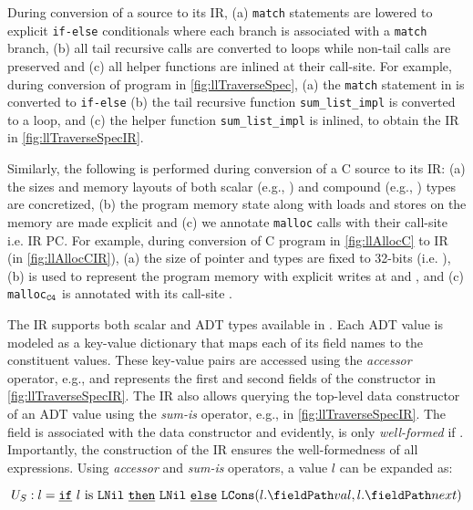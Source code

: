 During conversion of a \SpecL{} source to its IR,
(a) {\tt match} statements are lowered to explicit {\tt if-else} conditionals where each branch
is associated with a {\tt match} branch,
(b) all tail recursive calls are converted to loops while non-tail calls are preserved and
(c) all helper functions are inlined at their call-site.
For example, during conversion of \SpecL{} program in \cref{fig:llTraverseSpec},
(a) the {\tt match} statement in  is converted to {\tt if-else}
(b) the tail recursive function {\tt sum\_list\_impl} is converted to a loop,
and (c) the helper function {\tt sum\_list\_impl} is inlined,
to obtain the IR in \cref{fig:llTraverseSpecIR}.

Similarly, the following is performed during conversion of a C source to its IR:
(a) the sizes and memory layouts of both scalar (e.g., )
and compound (e.g., ) types are concretized,
(b) the program memory state along with loads and stores on the memory are made explicit and
(c) we annotate {\tt malloc} calls with their call-site i.e. IR PC.
For example, during conversion of C program in \cref{fig:llAllocC} to IR (in \cref{fig:llAllocCIR}),
(a) the size of pointer and  types are fixed to 32-bits (i.e. ),
(b) \mem{} is used to represent the program memory with explicit writes at  and ,
and (c) {\tt malloc$_{{\tt C4}}$} is annotated with its call-site .

The IR supports both scalar and ADT types available in \SpecL{}.
Each ADT value is modeled as a key-value dictionary that maps
each of its field names to the constituent values.
These key-value pairs are accessed using the {\em accessor} operator,
e.g.,  and  represents the first and second
fields of the  constructor in \cref{fig:llTraverseSpecIR}.
The IR also allows querying the top-level data constructor of an ADT value
using the {\em sum-is} operator, e.g.,  in \cref{fig:llTraverseSpecIR}.
The  field is associated with the  data constructor
and evidently,  is only {\em well-formed} if .
Importantly, the construction of the \SpecL{} IR ensures the well-formedness of all expressions.
Using {\em accessor} and {\em sum-is} operators, a  value $l$ can be expanded as:

\begin{equation}
\label{eqn:specDeconstruct}
U_S: l = \sumIf{\sumIs{l}{LNil}} \  \sumThen{\cons{LNil}} \  \sumElse{\cons{LCons}(\prodAccess{l}{val}, \prodAccess{l}{next})}
\end{equation}


